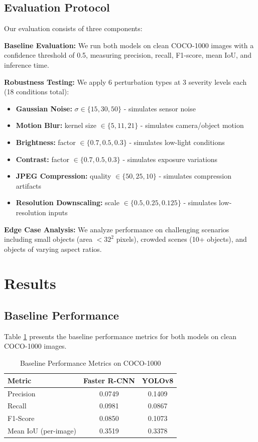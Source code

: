 \documentclass[conference]{IEEEtran}
\begin{document}
\subsection{Evaluation Protocol}

Our evaluation consists of three components:

\textbf{Baseline Evaluation:} We run both models on clean COCO-1000 images with a confidence threshold of 0.5, measuring precision, recall, F1-score, mean IoU, and inference time.

\textbf{Robustness Testing:} We apply 6 perturbation types at 3 severity levels each (18 conditions total):
\begin{itemize}
    \item \textbf{Gaussian Noise:} $\sigma \in \{15, 30, 50\}$ - simulates sensor noise
    \item \textbf{Motion Blur:} kernel size $\in \{5, 11, 21\}$ - simulates camera/object motion
    \item \textbf{Brightness:} factor $\in \{0.7, 0.5, 0.3\}$ - simulates low-light conditions
    \item \textbf{Contrast:} factor $\in \{0.7, 0.5, 0.3\}$ - simulates exposure variations
    \item \textbf{JPEG Compression:} quality $\in \{50, 25, 10\}$ - simulates compression artifacts
    \item \textbf{Resolution Downscaling:} scale $\in \{0.5, 0.25, 0.125\}$ - simulates low-resolution inputs
\end{itemize}

\textbf{Edge Case Analysis:} We analyze performance on challenging scenarios including small objects (area $< 32^2$ pixels), crowded scenes (10+ objects), and objects of varying aspect ratios.

\section{Results}

\subsection{Baseline Performance}

Table \ref{tab:baseline} presents the baseline performance metrics for both models on clean COCO-1000 images.

\begin{table}[h]
\centering
\caption{Baseline Performance Metrics on COCO-1000}
\label{tab:baseline}
\begin{tabular}{lcc}
\toprule
\textbf{Metric} & \textbf{Faster R-CNN} & \textbf{YOLOv8} \\
\midrule
Precision & 0.0749 & 0.1409 \\
Recall & 0.0981 & 0.0867 \\
F1-Score & 0.0850 & 0.1073 \\
Mean IoU (per-image) & 0.3519 & 0.3378 \\
\bottomrule
\end{tabular}
\end{table}
\end{document}
